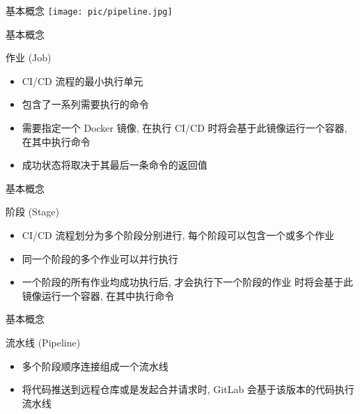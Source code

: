 \documentclass{beamer}
\begin{document}
\begin{frame}{基本概念}
\texttt{[image: pic/pipeline.jpg]}
\end{frame}

\begin{frame}{基本概念}
    \begin{block}{作业 (Job)}
        \begin{itemize}
            \item  CI/CD 流程的最小执行单元
            \item 包含了一系列需要执行的命令
            \item 需要指定一个 Docker 镜像, 在执行 CI/CD 时将会基于此镜像运行一个容器, 在其中执行命令
            \item 成功状态将取决于其最后一条命令的返回值
        \end{itemize}
    \end{block}
\end{frame}

\begin{frame}{基本概念}
    \begin{block}{阶段 (Stage)}
        \begin{itemize}
            \item CI/CD 流程划分为多个阶段分别进行, 每个阶段可以包含一个或多个作业
            \item 同一个阶段的多个作业可以并行执行
            \item 一个阶段的所有作业均成功执行后, 才会执行下一个阶段的作业 时将会基于此镜像运行一个容器, 在其中执行命令
        \end{itemize}
    \end{block}
\end{frame}

\begin{frame}{基本概念}
    \begin{block}{流水线 (Pipeline)}
        \begin{itemize}
            \item 多个阶段顺序连接组成一个流水线
            \item 将代码推送到远程仓库或是发起合并请求时, GitLab 会基于该版本的代码执行流水线
        \end{itemize}
    \end{block}
\end{frame}
\end{document}
